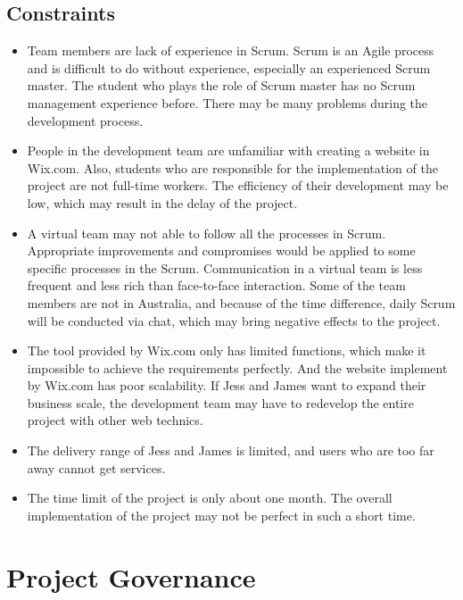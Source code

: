 \documentclass{report}
\begin{document}
\section{Constraints}
\label{sec:constraints}
\begin{itemize}
  \item Team members are lack of experience in Scrum. Scrum is an Agile process and is difficult to do without experience, especially an experienced Scrum master. The student who plays the role of Scrum master has no Scrum management experience before. There may be many problems during the development process.
  \item People in the development team are unfamiliar with creating a website in Wix.com. Also, students who are responsible for the implementation of the project are not full-time workers. The efficiency of their development may be low, which may result in the delay of the project.
  \item A virtual team may not able to follow all the processes in Scrum. Appropriate improvements and compromises would be applied to some specific processes in the Scrum. Communication in a virtual team is less frequent and less rich than face-to-face interaction. Some of the team members are not in Australia, and because of the time difference, daily Scrum will be conducted via chat, which may bring negative effects to the project.
  \item The tool provided by Wix.com only has limited functions, which make it impossible to achieve the requirements perfectly. And the website implement by Wix.com has poor scalability. If Jess and James want to expand their business scale, the development team may have to redevelop the entire project with other web technics.
  \item The delivery range of Jess and James is limited, and users who are too far away cannot get services.
  \item The time limit of the project is only about one month. The overall implementation of the project may not be perfect in such a short time.
\end{itemize}

\chapter{Project Governance}
\label{chap:projectGovernance}
\end{document}
